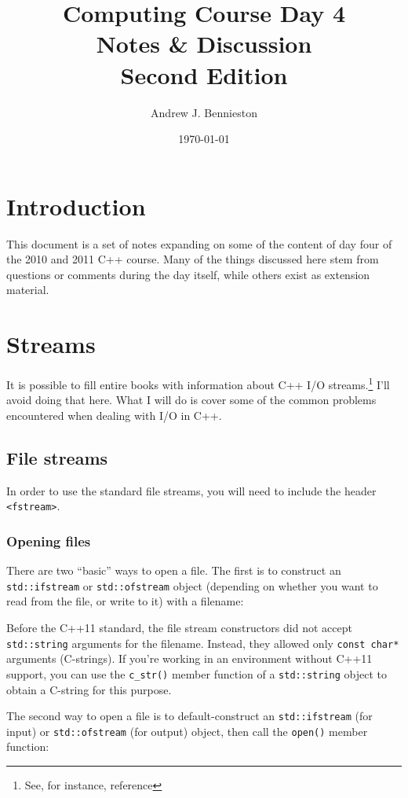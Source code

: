 \documentclass[a4paper]{scrartcl}
\title{Computing Course Day 4\\
Notes \& Discussion\\
Second Edition}
\author{Andrew J. Bennieston}
\date{\today}
\begin{document}
\maketitle

\tableofcontents

\pagebreak

\section{Introduction}\label{sec:introduction}
This document is a set of notes expanding on some of the content of day four of the 2010 and 2011 C++ course. Many of the things discussed here stem from questions or comments during the day itself, while others exist as extension material.

\section{Streams}\label{sec:streams}
It is possible to fill entire books with information about C++ I/O streams.\footnote{See, for instance, reference\cite{IOStreams}} I'll avoid doing that here. What I will do is cover some of the common problems encountered when dealing with I/O in C++.

\subsection{File streams}
In order to use the standard file streams, you will need to include the header \verb|<fstream>|.

\subsubsection{Opening files}
There are two ``basic'' ways to open a file. The first is to construct an \verb|std::ifstream| or \verb|std::ofstream| object (depending on whether you want to read from the file, or write to it) with a filename:


Before the C++11 standard, the file stream constructors did not accept \verb|std::string| arguments for the filename. Instead, they allowed only \verb|const char*| arguments (C-strings). If you're working in an environment without C++11 support, you can use the \verb|c_str()| member function of a \verb|std::string| object to obtain a C-string for this purpose.

The second way to open a file is to default-construct an \verb|std::ifstream| (for input) or \verb|std::ofstream| (for output) object, then call the \verb|open()| member function:

\end{document}
